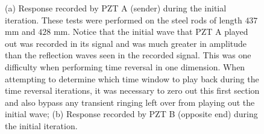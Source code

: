 \documentclass[11pt,letterpaper]{article}%
\begin{document}
\begin{figure}
\begin{subfigmatrix}{2}
\end{subfigmatrix}
%
   \caption[all]
   { \label{initRead}
(a) Response recorded by PZT A (sender) during the initial iteration. These tests were performed on the steel rods of length $437$ mm and $428$ mm. Notice that the initial wave that PZT A played out was recorded in its signal and was much greater in amplitude than the reflection waves seen in the recorded signal. This was one difficulty when performing time reversal in one dimension. When attempting to determine which time window to play back during the time reversal iterations, it was necessary to zero out this first section and also bypass any transient ringing left over from playing out the initial wave;
(b) Response recorded by PZT B (opposite end) during the initial iteration.
 }
   \end{figure}
\end{document}
